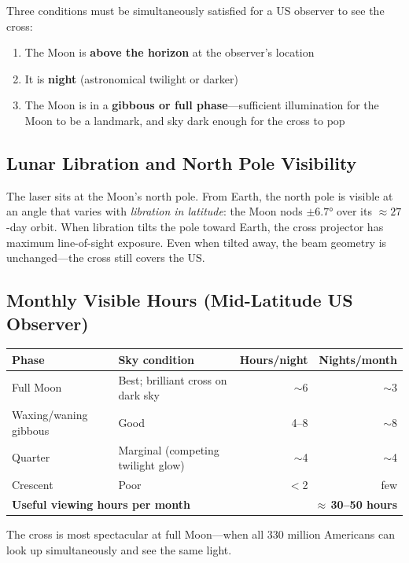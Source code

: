 \documentclass[12pt,letterpaper]{article}
\begin{document}
Three conditions must be simultaneously satisfied for a US observer to see the
cross:
\begin{enumerate}
  \item The Moon is \textbf{above the horizon} at the observer's location
  \item It is \textbf{night} (astronomical twilight or darker)
  \item The Moon is in a \textbf{gibbous or full phase}---sufficient illumination
        for the Moon to be a landmark, and sky dark enough for the cross to pop
\end{enumerate}

\subsection{Lunar Libration and North Pole Visibility}

The laser sits at the Moon's north pole. From Earth, the north pole is visible
at an angle that varies with \emph{libration in latitude}: the Moon nods
$\pm\ang{6.7}$ over its $\approx 27$-day orbit. When libration tilts the pole
toward Earth, the cross projector has maximum line-of-sight exposure. Even when
tilted away, the beam geometry is unchanged---the cross still covers the US.

\subsection{Monthly Visible Hours (Mid-Latitude US Observer)}

\begin{center}
\begin{tabular}{llrr}
\toprule
\textbf{Phase} & \textbf{Sky condition} & \textbf{Hours/night} & \textbf{Nights/month} \\
\midrule
Full Moon & Best; brilliant cross on dark sky & $\sim$6 & $\sim$3 \\
Waxing/waning gibbous & Good & 4--8 & $\sim$8 \\
Quarter & Marginal (competing twilight glow) & $\sim$4 & $\sim$4 \\
Crescent & Poor & $<$2 & few \\
\midrule
\multicolumn{2}{l}{\textbf{Useful viewing hours per month}} & \multicolumn{2}{r}{\textbf{$\approx$\,30--50 hours}} \\
\bottomrule
\end{tabular}
\end{center}

The cross is most spectacular at full Moon---when all 330 million Americans can
look up simultaneously and see the same light.
\end{document}

